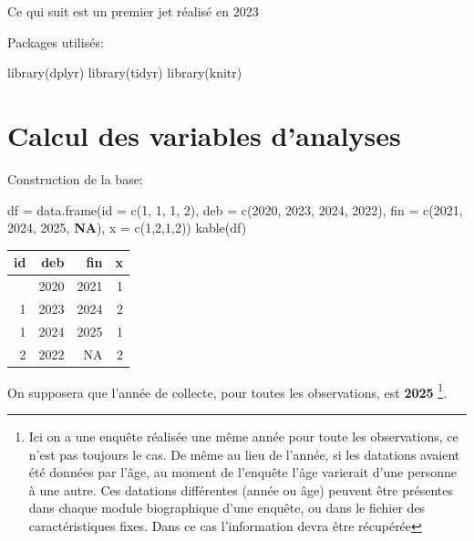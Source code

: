 \documentclass[
  12pt,
  letterpaper,
  DIV=11,
  numbers=noendperiod,
  onepage,
  openany]{scrreprt}
\newenvironment{Shaded}{\begin{snugshade}}{\end{snugshade}}
\newcommand{\AttributeTok}[1]{\textcolor[rgb]{0.80,0.80,0.80}{#1}}
\newcommand{\ConstantTok}[1]{\textcolor[rgb]{0.86,0.64,0.64}{\textbf{#1}}}
\newcommand{\DecValTok}[1]{\textcolor[rgb]{0.86,0.86,0.80}{#1}}
\newcommand{\FunctionTok}[1]{\textcolor[rgb]{0.94,0.94,0.56}{#1}}
\newcommand{\NormalTok}[1]{\textcolor[rgb]{0.80,0.80,0.80}{#1}}
\newcommand{\OtherTok}[1]{\textcolor[rgb]{0.94,0.94,0.56}{#1}}
\begin{document}
Ce qui suit est un premier jet réalisé en 2023

Packages utilisés:

\begin{Shaded}
\begin{Highlighting}[]
\FunctionTok{library}\NormalTok{(dplyr)}
\FunctionTok{library}\NormalTok{(tidyr)}
\FunctionTok{library}\NormalTok{(knitr)}
\end{Highlighting}
\end{Shaded}

\hypertarget{calcul-des-variables-danalyses}{%
\section{Calcul des variables
d'analyses}\label{calcul-des-variables-danalyses}}

Construction de la base:

\begin{Shaded}
\begin{Highlighting}[]
\NormalTok{df }\OtherTok{=} \FunctionTok{data.frame}\NormalTok{(}\AttributeTok{id  =}  \FunctionTok{c}\NormalTok{(}\DecValTok{1}\NormalTok{, }\DecValTok{1}\NormalTok{, }\DecValTok{1}\NormalTok{, }\DecValTok{2}\NormalTok{),}
                \AttributeTok{deb =}  \FunctionTok{c}\NormalTok{(}\DecValTok{2020}\NormalTok{, }\DecValTok{2023}\NormalTok{, }\DecValTok{2024}\NormalTok{, }\DecValTok{2022}\NormalTok{),}
                \AttributeTok{fin =}  \FunctionTok{c}\NormalTok{(}\DecValTok{2021}\NormalTok{, }\DecValTok{2024}\NormalTok{, }\DecValTok{2025}\NormalTok{, }\ConstantTok{NA}\NormalTok{), }
                  \AttributeTok{x =}  \FunctionTok{c}\NormalTok{(}\DecValTok{1}\NormalTok{,}\DecValTok{2}\NormalTok{,}\DecValTok{1}\NormalTok{,}\DecValTok{2}\NormalTok{))}
\FunctionTok{kable}\NormalTok{(df)}
\end{Highlighting}
\end{Shaded}

\begin{longtable}[]{@{}rrrr@{}}
\toprule\noalign{}
id & deb & fin & x \\
\midrule\noalign{}
\endhead
\bottomrule\noalign{}
\endlastfoot
1 & 2020 & 2021 & 1 \\
1 & 2023 & 2024 & 2 \\
1 & 2024 & 2025 & 1 \\
2 & 2022 & NA & 2 \\
\end{longtable}

On supposera que l'année de collecte, pour toutes les observations, est
\textbf{2025} \footnote{Ici on a une enquête réalisée une même année
  pour toute les observations, ce n'est pas toujours le cas. De même au
  lieu de l'année, si les datations avaient été données par l'âge, au
  moment de l'enquête l'âge varierait d'une personne à une autre. Ces
  datations différentes (année ou âge) peuvent être présentes dans
  chaque module biographique d'une enquête, ou dans le fichier des
  caractéristiques fixes. Dans ce cas l'information devra être récupérée}.
\end{document}
